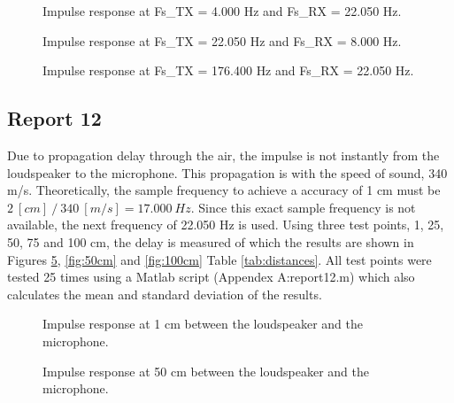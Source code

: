 \documentclass[final]{scrreprt} %
\begin{document}
\begin{figure}[H]
	\centering
	\setlength\figureheight{4cm}
    	\setlength{}
	
	\caption{Impulse response at Fs\_TX = 4.000 Hz and Fs\_RX = 22.050 Hz.}
	\label{fig:response_2}
\end{figure}

\begin{figure}[H]
	\centering
	\setlength\figureheight{4cm}
    	\setlength{}
	
	\caption{Impulse response at Fs\_TX = 22.050 Hz and Fs\_RX = 8.000 Hz.}
	\label{fig:response_3}
\end{figure}

\begin{figure}[H]
	\centering
	\setlength\figureheight{4cm}
    	\setlength{}
	
	\caption{Impulse response at Fs\_TX = 176.400 Hz and Fs\_RX = 22.050 Hz.}
	\label{fig:highest_freq}
\end{figure}

\subsection*{Report 12}
Due to propagation delay through the air, the impulse is not instantly from the loudspeaker to the microphone.
This propagation is with the speed of sound, 340 m/s.
Theoretically, the sample frequency to achieve a accuracy of 1 cm must be $2 ~[cm] ~/~ 340 ~[m/s] = 17.000 ~ Hz$.
Since this exact sample frequency is not available, the next frequency of 22.050 Hz is used.
Using three test points, 1, 25, 50, 75 and 100 cm, the delay is measured of which the results are shown in Figures \ref{fig:1cm}, \ref{fig:50cm} and \ref{fig:100cm} Table \ref{tab:distances}.
All test points were tested 25 times using a Matlab script (Appendex A:report12.m) which also calculates the mean and standard deviation of the results.

\begin{figure}[H]
	\centering
	\setlength\figureheight{4cm}
    	\setlength{}
	
	\caption{Impulse response at 1 cm between the loudspeaker and the microphone.}
	\label{fig:1cm}
\end{figure}

\begin{figure}[H]
	\centering
	\setlength\figureheight{4cm}
    	\setlength{}
	
	\caption{Impulse response at 50 cm between the loudspeaker and the microphone.}
	\label{fig:1cm}
\end{figure}
\end{document}
